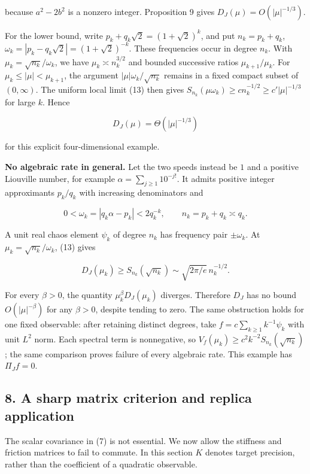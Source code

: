 \documentclass[
  british,
  11pt,
  a4paper,
]{article}
\begin{document}
because \(a^2-2b^2\) is a nonzero integer. Proposition 9 gives
\(D_J(\mu)=O(|\mu|^{-1/3})\).

For the lower bound, write \(p_k+q_k\sqrt2=(1+\sqrt2)^k\), and put
\(n_k=p_k+q_k\), \(\omega_k=|p_k-q_k\sqrt2|=(1+\sqrt2)^{-k}\). These
frequencies occur in degree \(n_k\). With \(\mu_k=\sqrt{n_k}/\omega_k\),
we have \(\mu_k\asymp n_k^{3/2}\) and bounded successive ratios
\(\mu_{k+1}/\mu_k\). For \(\mu_k\le|\mu|<\mu_{k+1}\), the argument
\(|\mu|\omega_k/\sqrt{n_k}\) remains in a fixed compact subset of
\((0,\infty)\). The uniform local limit (13) then gives
\(S_{n_k}(\mu\omega_k)\ge c n_k^{-1/2}\ge c'|\mu|^{-1/3}\) for large
\(k\). Hence

\[
D_J(\mu)=\Theta(|\mu|^{-1/3}) \tag{29}
\]

for this explicit four-dimensional example.

\textbf{No algebraic rate in general.} Let the two speeds instead be
\(1\) and a positive Liouville number, for example
\(\alpha=\sum_{j\ge1}10^{-j!}\). It admits positive integer approximants
\(p_k/q_k\) with increasing denominators and

\[
0<\omega_k=|q_k\alpha-p_k|<2q_k^{-k},\qquad n_k=p_k+q_k\asymp q_k.
\]

A unit real chaos element \(\psi_k\) of degree \(n_k\) has frequency
pair \(\pm\omega_k\). At \(\mu_k=\sqrt{n_k}/\omega_k\), (13) gives

\[
D_J(\mu_k)\ge S_{n_k}(\sqrt{n_k})
\sim\sqrt{2\pi/e}\,n_k^{-1/2}.
\]

For every \(\beta>0\), the quantity \(\mu_k^\beta D_J(\mu_k)\) diverges.
Therefore \(D_J\) has no bound \(O(|\mu|^{-\beta})\) for any
\(\beta>0\), despite tending to zero. The same obstruction holds for one
fixed observable: after retaining distinct degrees, take
\(f=c\sum_{k\ge1}k^{-1}\psi_k\) with unit \(L^2\) norm. Each spectral
term is nonnegative, so \(V_f(\mu_k)\ge c^2k^{-2}S_{n_k}(\sqrt{n_k})\);
the same comparison proves failure of every algebraic rate. This example
has \(\Pi_Jf=0\).

\subsection{8. A sharp matrix criterion and replica
application}\label{a-sharp-matrix-criterion-and-replica-application}

The scalar covariance in (7) is not essential. We now allow the
stiffness and friction matrices to fail to commute. In this section
\(K\) denotes target precision, rather than the coefficient of a
quadratic observable.
\end{document}
